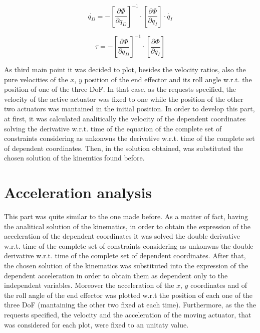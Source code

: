 \documentclass[10.5pt, twocolumn]{article}
\begin{document}
{  \begin{equation}
    \dot{q_D} = -\left[\frac{\partial \Phi }{\partial q_D}\right]^{-1} \cdot \left[\frac{\partial \Phi }{\partial q_I}\right] \cdot \dot{q_I}
  \end{equation}

  \begin{equation}
    \tau = - \left[\frac{\partial \Phi }{\partial q_D}\right]^{-1} \cdot \left[\frac{\partial \Phi }{\partial q_I}\right]
  \end{equation}

As third main point it was decided to plot, besides the velocity ratios, also the pure velocities of the \( x \), \( y \) position of the end effector and its roll angle w.r.t. the position of one of the three DoF. In that case, as the requests specified, the velocity of the active actuator was fixed to one while the position of the other two actuators was mantained in the initial position.
In order to develop this part, at first, it was calculated analitically the velocity of the dependent coordinates solving the derivative w.r.t. time of the equation of the complete set of constraints considering as unkonwns the derivative w.r.t. time of the complete set of dependent coordinates. Then, in the solution obtained, was substituted the chosen solution of the kinemtics found before.

\section{Acceleration analysis}
This part was quite similar to the one made before.
As a matter of fact, having the analitical solution of the kinematics, in order to obtain the expression of the acceleration of the dependent coordinates it was solved the double derivative w.r.t. time of the complete set of constraints considering as unkonwns the double derivative w.r.t. time of the complete set of dependent coordinates.
After that, the chosen solution of the kinematics was substituted into the expression of the dependent acceleration in order to obtain them as dependent only to the independent variables.
Moreover the acceleration of the \( x \), \( y \) coordinates and of the roll angle of the end effector was plotted w.r.t the position of each one of the three DoF (mantaining the other two fixed at each time). Furthermore, as the the requests specified, the velocity and the acceleration of the moving actuator, that was considered for each plot, were fixed to an unitaty value.

}
\end{document}
